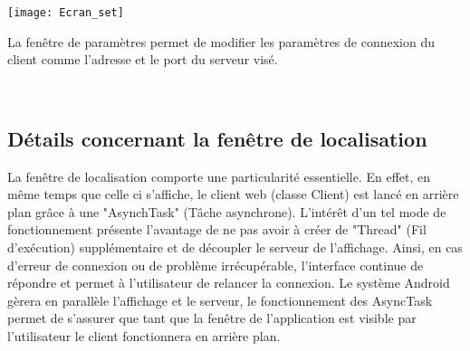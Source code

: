 	\begin{minipage}{0.35\linewidth}
  	\centering
 	 \texttt{[image: Ecran\_set]}
	\end{minipage}
	\begin{minipage}{0.45\linewidth}
	La fenêtre de paramètres permet de modifier les paramètres de connexion du client comme l'adresse et le port du serveur visé.
	\end{minipage}
	~\\	
	
\subsection{Détails concernant la fenêtre de localisation}

	La fenêtre de localisation comporte une particularité essentielle. En effet, en même temps que celle ci s'affiche, le client web (classe Client) est lancé en arrière plan grâce à une "AsynchTask" (Tâche asynchrone). L'intérêt d'un tel mode de fonctionnement présente l'avantage de ne pas avoir à créer de "Thread" (Fil d'exécution) supplémentaire et de découpler le serveur de l'affichage. Ainsi, en cas d'erreur de connexion ou de problème irrécupérable, l'interface continue de répondre et permet à l'utilisateur de relancer la connexion. Le système Android gèrera en parallèle l'affichage et le serveur, le fonctionnement des AsyncTask permet de s'assurer que tant que la fenêtre de l'application est visible par l'utilisateur le client fonctionnera en arrière plan.
	
	 

	

